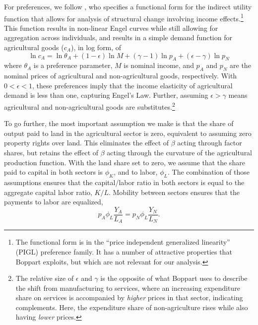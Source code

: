 \documentclass[11pt]{article}
\begin{document}
For preferences, we follow \cite{boppart2014}, who specifies a functional form for the indirect utility function that allows for analysis of structural change involving income effects.\footnote{The functional form is in the ``price independent generalized linearity'' (PIGL) preference family. It has a number of attractive properties that Boppart exploits, but which are not relevant for our analysis.} This function results in non-linear Engel curves while still allowing for aggregation across individuals, and results in a simple demand function for agricultural goods ($c_A$), in log form, of
\begin{equation}
    \ln c_A = \ln \theta_A + (1-\epsilon) \ln M + (\gamma - 1) \ln p_A + (\epsilon - \gamma) \ln p_N \label{EQ_ca_demand}
\end{equation}
where $\theta_A$ is a preference parameter, $M$ is nominal income, and $p_A$ and $p_N$ are the nominal prices of agricultural and non-agricultural goods, respectively. With $0 < \epsilon < 1$, these preferences imply that the income elasticity of agricultural demand is less than one, capturing Engel's Law. Further, assuming $\epsilon > \gamma$ means agricultural and non-agricultural goods are substitutes.\footnote{The relative size of $\epsilon$ and $\gamma$ is the opposite of what Boppart uses to describe the shift from manufacturing to services, where an increasing expenditure share on services is accompanied by \textit{higher} prices in that sector, indicating complements. Here, the expenditure share of non-agriculture rises while also having \textit{lower} prices.}

To go further, the most important assumption we make is that the share of output paid to land in the agricultural sector is zero, equivalent to assuming zero property rights over land. This eliminates the effect of $\beta$ acting through factor shares, but retains the effect of $\beta$ acting through the curvature of the agricultural production function. With the land share set to zero, we assume that the share paid to capital in both sectors is $\phi_K$, and to labor, $\phi_L$. The combination of those assumptions ensures that the capital/labor ratio in both sectors is equal to the aggregate capital labor ratio, $K/L$. Mobility between sectors ensures that the payments to labor are equalized,
\begin{equation}
    p_A \phi_L \frac{Y_A}{L_A} = p_N \phi_L \frac{Y_N}{L_N}. \label{EQ_mobility}
\end{equation}
\end{document}
